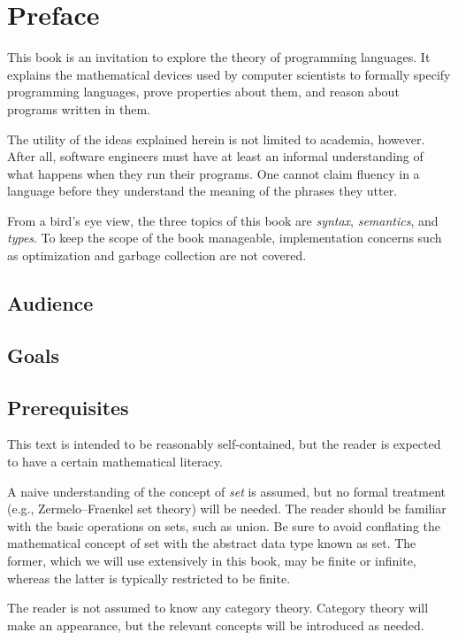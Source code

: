 \chapter{Preface}

  This book is an invitation to explore the theory of programming languages. It explains the mathematical devices used by computer scientists to formally specify programming languages, prove properties about them, and reason about programs written in them.

  The utility of the ideas explained herein is not limited to academia, however. After all, software engineers must have at least an informal understanding of what happens when they run their programs. One cannot claim fluency in a language before they understand the meaning of the phrases they utter.

  From a bird's eye view, the three topics of this book are \emph{syntax}, \emph{semantics}, and \emph{types}. To keep the scope of the book manageable, implementation concerns such as optimization and garbage collection are not covered.

  \section*{Audience}

  \section*{Goals}

  \section*{Prerequisites}

    This text is intended to be reasonably self-contained, but the reader is expected to have a certain mathematical literacy.

    A naive understanding of the concept of \emph{set} is assumed, but no formal treatment (e.g., Zermelo--Fraenkel set theory) will be needed. The reader should be familiar with the basic operations on sets, such as union. Be sure to avoid conflating the mathematical concept of set with the abstract data type known as set. The former, which we will use extensively in this book, may be finite or infinite, whereas the latter is typically restricted to be finite.

    The reader is not assumed to know any category theory. Category theory will make an appearance, but the relevant concepts will be introduced as needed.


